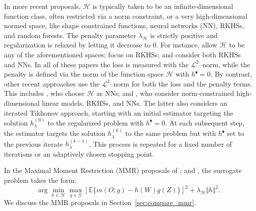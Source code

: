 \documentclass[twoside,11pt]{article}
\newcommand{\E}{\mathbb{E}}
\newcommand{\mc}{\mathcal}
\begin{document}






In more recent proposals, $\mathcal{H}$ is typically taken to be an infinite-dimensional function class, often restricted via a norm constraint, or a very high-dimensional normed space, like  shape constrained functions, neural networks (NN), RKHSs, and random forests. The penalty parameter $\lambda_{\mathcal{H}}$ is strictly positive and regularization is relaxed by letting it decrease to $0$. For instance, \citet{dikkala2020minimax} allow $\mathcal{H}$ to be any of the aforementioned spaces; \citet{ghassami2022minimax} focus on RKHSs; and \citet{bennett2022inference} consider both RKHSs and NNs. In all of these papers the loss is measured with the $\mathcal{L}^2$--norm, while the penalty is defined via the norm of the function space $\mc{H}$ with $h^\blacklozenge =0$. By contrast, other recent approaches use the $\mathcal{L}^2$--norm for both the loss and the penalty terms. This includes \citet{liao2020provably}, who choose $\mc{H}$ as NNs; and \citet{bennett2023source}, who consider norm-constrained high-dimensional linear models, RKHSs, and NNs. 
The latter also considers an iterated Tikhonov approach, starting with an initial estimator targeting the solution $h_\lambda^{(0)}$ to the regularized problem with $h^\blacklozenge = 0$. At each subsequent step, the estimator targets the solution $h_\lambda^{(k)}$ to the same problem but with $h^\blacklozenge$ set to the previous iterate $h_\lambda^{(k-1)}$. This process is repeated for a fixed number of iterations or an adaptively chosen stopping point.

In the Maximal Moment Restriction (MMR) proposals of \cite{muandet2020kernel, mastouri2021proximal,kallus2021causal, zhang2023instrumental}; and \cite{park2024proximal}, the surrogate problem takes the form:
\begin{equation*}
\arg\min_{h\in\mc{H}}\max_{g\in\mc{G}}\left[\E\{m(O;g)-h(W)g(Z)\}\right]^2+\lambda_\mc{H}\Vert h\Vert^2.
\end{equation*}
We discuss the MMR proposals in Section~\ref{sec:compare_mmr}.
\end{document}
